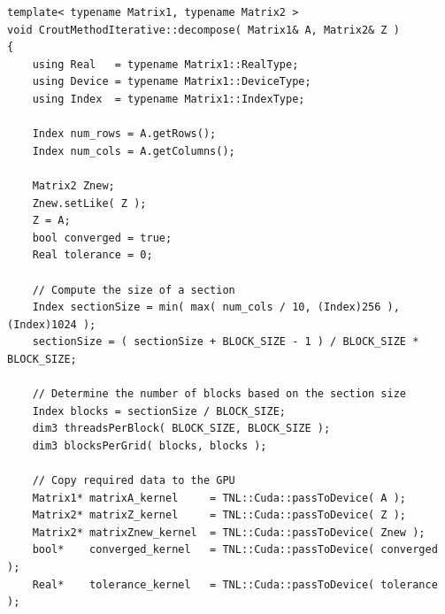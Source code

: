 \begin{lstlisting}[caption={GPU implementation of the Iterative Crout method. Some code has been omitted as it is not important for the description, for example, checking if the input matrix is square. Overall, the code performs the following: initialization of variables (including CUDA grid specifications, page-locked host memory, streams, etc.), then the entire matrix $ \mathbb{A} $ is decomposed using the \textit{Convergence by sections} concept. The constant \code{BLOCK\_SIZE} dictates how many threads are present in a single thread block. The \code{converged\_host} variable is purposefully initialized using page-locked host memory as its value is copied between the host and device in every iteration of the do-while loop. Thus, as described in \textit{\nameref{Paragraph:CUDA-memory-management-page-locked-host-memory}} in Section~\ref{Paragraph:CUDA-memory-management-page-locked-host-memory}, the higher bandwidth provided can help reduce the overall time spent copying during computation. Taken from the Decomposition project repository on GitLab\protect\footref{Footnote:decomposition-project-gitlab-url}.},label={Listing:implementation-decomposition-project-lu-decomposition-iterative-crout-method-convergence-by-sections},escapechar=@]
template< typename Matrix1,	typename Matrix2 >
void CroutMethodIterative::decompose( Matrix1& A, Matrix2& Z )
{
	using Real   = typename Matrix1::RealType;
	using Device = typename Matrix1::DeviceType;
	using Index  = typename Matrix1::IndexType;
	
	Index num_rows = A.getRows();
	Index num_cols = A.getColumns();
	
	Matrix2 Znew;
	Znew.setLike( Z );
	Z = A;
	bool converged = true;
	Real tolerance = 0;
	
	// Compute the size of a section
	Index sectionSize = min( max( num_cols / 10, (Index)256 ), (Index)1024 );
	sectionSize = ( sectionSize + BLOCK_SIZE - 1 ) / BLOCK_SIZE * BLOCK_SIZE;
	
	// Determine the number of blocks based on the section size
	Index blocks = sectionSize / BLOCK_SIZE;
	dim3 threadsPerBlock( BLOCK_SIZE, BLOCK_SIZE );
	dim3 blocksPerGrid( blocks, blocks );
	
	// Copy required data to the GPU
	Matrix1* matrixA_kernel     = TNL::Cuda::passToDevice( A );
	Matrix2* matrixZ_kernel     = TNL::Cuda::passToDevice( Z );
	Matrix2* matrixZnew_kernel  = TNL::Cuda::passToDevice( Znew );
	bool*    converged_kernel   = TNL::Cuda::passToDevice( converged );
	Real*    tolerance_kernel   = TNL::Cuda::passToDevice( tolerance );
	

\end{lstlisting}
